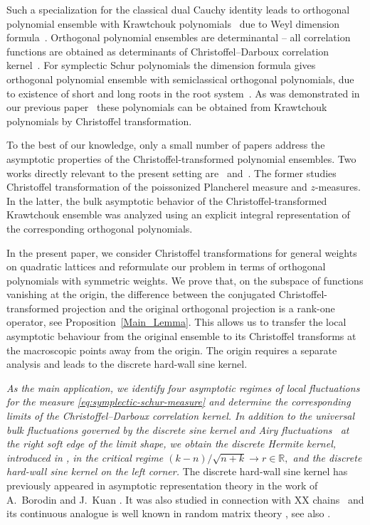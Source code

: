 \documentclass[reqno,11pt]{amsart}
\newcommand{\RR}{\mathbb{R}}
\theoremstyle{plain}
\theoremstyle{definition}
\numberwithin{equation}{section}
\begin{document}
Such a specialization for the classical dual Cauchy identity leads to orthogonal polynomial ensemble with Krawtchouk
polynomials~\cite{johansson2002non,borodin2007asymptotics} due to Weyl dimension formula~\cite{nazarov2024skew}. Orthogonal polynomial
ensembles are determinantal -- all correlation functions are obtained as determinants of Christoffel--Darboux correlation kernel~\cite{Simon2008}.
For symplectic Schur polynomials the dimension formula gives orthogonal polynomial ensemble with semiclassical orthogonal polynomials, due to existence of short and long roots in the root
system~\cite{NNP20,NazarovSelemenchuk2025}.  As was demonstrated in our previous paper~\cite{NazarovSelemenchuk2025} these polynomials can be obtained from Krawtchouk polynomials by Christoffel transformation.

 To the best of our knowledge, only a small number of papers address the asymptotic properties of the Christoffel-transformed polynomial ensembles. Two works directly relevant to the present setting are~\cite{lazag2025explicit} and~\cite{NazarovSelemenchuk2025}. The former  studies Christoffel transformation of the poissonized Plancherel measure and $z$-measures. In the latter, the bulk asymptotic behavior of the Christoffel-transformed Krawtchouk ensemble was analyzed using an explicit integral representation of the corresponding orthogonal polynomials. 

 In the present paper, we consider Christoffel transformations for general weights on quadratic lattices and reformulate our problem in terms of orthogonal polynomials with symmetric weights. We prove that, on the subspace of functions vanishing at the origin, the difference between the conjugated Christoffel-transformed projection and the original orthogonal projection is a rank-one operator, see Proposition~\ref{Main_Lemma}. 
This allows us to transfer the local asymptotic behaviour from the original ensemble to its Christoffel transforms at the macroscopic points away from the origin. The origin requires a separate analysis and leads to the discrete hard-wall sine kernel.
 
 \emph{As the main application, we identify four asymptotic regimes of local fluctuations for the measure \eqref{eq:symplectic-schur-measure} and determine the corresponding limits of the Christoffel--Darboux correlation kernel. In addition to the universal bulk fluctuations governed by the discrete sine kernel and Airy fluctuations~\cite{TracyWidom1994,deiftorthogonal} at the right soft edge of the limit shape, we obtain the discrete Hermite kernel, introduced in \cite{borodin2007asymptotics}, in the critical regime
$(k-n)/\sqrt{n+k}\longrightarrow r\in\RR,$ and the discrete hard-wall sine kernel on the left corner.} The discrete hard-wall sine kernel has previously appeared in asymptotic representation theory in the work of A.~Borodin and J.~Kuan \cite{borodin2010random}.
 It was also studied in connection with XX chains~\cite{Fagotti2011} and its continuous analogue is well known in random matrix theory \cite{Erhardt2007Dyson, verbaarschot1994,verbaarschot2000}, see also  \cite[Sections 3.1 and
7.2.7]{forrester2010log}.
\end{document}
